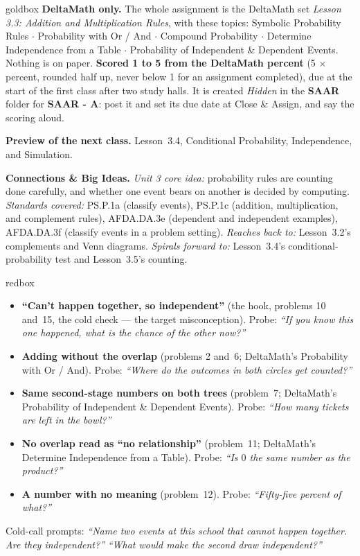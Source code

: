 \documentclass[10pt]{article}
\begin{document}
\boxguard
\begin{skillbox}{goldbox}
\textbf{DeltaMath only.} The whole assignment is the DeltaMath set \emph{Lesson 3.3: Addition
and Multiplication Rules}, with these topics: Symbolic Probability Rules $\cdot$ Probability with
Or / And $\cdot$ Compound Probability $\cdot$ Determine Independence from a Table $\cdot$
Probability of Independent \& Dependent Events. Nothing is on paper. \textbf{Scored 1 to 5 from
the DeltaMath percent} (5 $\times$ percent, rounded half up, never below 1 for an assignment
completed), due at the start of the first class after two study halls. It is created
\emph{Hidden} in the \textbf{SAAR} folder for \textbf{SAAR - A}: post it and set its due date at
Close \& Assign, and say the scoring aloud.

\textbf{Preview of the next class.} Lesson~3.4, Conditional Probability, Independence, and
Simulation.

\textbf{Connections \& Big Ideas.} \textit{Unit 3 core idea:} probability rules are counting
done carefully, and whether one event bears on another is decided by computing.
\textit{Standards covered:} PS.P.1a (classify events), PS.P.1c (addition, multiplication, and
complement rules), AFDA.DA.3e (dependent and independent examples), AFDA.DA.3f (classify events
in a problem setting). \textit{Reaches back to:} Lesson~3.2's complements and Venn diagrams.
\textit{Spirals forward to:} Lesson~3.4's conditional-probability test and Lesson~3.5's counting.
\end{skillbox}

\boxguard
\begin{skillbox}{redbox}
\begin{itemize}[leftmargin=1.2em, nosep]
  \item \textbf{``Can't happen together, so independent''} (the hook, problems 10 and~15, the
        cold check --- the target misconception). Probe: \emph{``If you know this one happened,
        what is the chance of the other now?''}
  \item \textbf{Adding without the overlap} (problems 2 and~6; DeltaMath's Probability with Or /
        And). Probe: \emph{``Where do the outcomes in both circles get counted?''}
  \item \textbf{Same second-stage numbers on both trees} (problem~7; DeltaMath's Probability of
        Independent \& Dependent Events). Probe: \emph{``How many tickets are left in the
        bowl?''}
  \item \textbf{No overlap read as ``no relationship''} (problem~11; DeltaMath's Determine
        Independence from a Table). Probe: \emph{``Is $0$ the same number as the product?''}
  \item \textbf{A number with no meaning} (problem~12). Probe: \emph{``Fifty-five percent
        of what?''}
\end{itemize}
Cold-call prompts: \emph{``Name two events at this school that cannot happen together. Are they
independent?''} \quad \emph{``What would make the second draw independent?''}
\end{skillbox}
\end{document}
